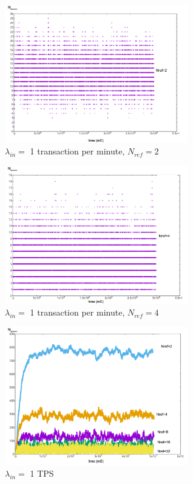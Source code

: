 \documentclass[a4paper,10pt,twocolumn]{article}
\begin{document}
	\begin{appendices}
	\label{Appendix A}
	
	\begin{figure}[H]
		\begin{center}
		\includegraphics[width=80mm]{1min_2.png}
		  \caption{\( \lambda_{in}=\) 1 transaction per minute, \( N_{ref}=2\)}
		\label{fig:min1_2}
		\end{center}
	 \end{figure}
	
	 \begin{figure}[H]
		\begin{center}
			\includegraphics[width=80mm]{1min_4.png}
			\caption{\( \lambda_{in}=\) 1 transaction per minute, \( N_{ref}=4\)}
		  \label{fig:min1_4}
		\end{center}
	 \end{figure}
	
	 \begin{figure}[H]
		\begin{center}
		\includegraphics[width=80mm]{1sec.png}
		  \caption{\( \lambda_{in}=\) 1 TPS}
		\label{fig:sec1}
		\end{center}
	 \end{figure}
	

\end{appendices}
\end{document}
